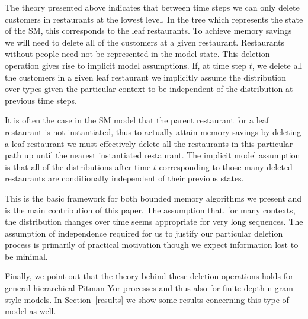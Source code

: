 The theory presented above indicates that between time steps we can only delete customers in restaurants at the lowest level.  In the tree which represents the state of the SM, this corresponds to the leaf restaurants.  To achieve memory savings we will need to delete all of the customers at a given restaurant.  Restaurants without people need not be represented in the model state.  This deletion operation gives rise to implicit model assumptions. If, at time step $t$, we delete all the customers in a given leaf restaurant we implicitly assume the distribution over types given the particular context to be independent of the distribution at previous time steps.

It is often the case in the SM model that the parent restaurant for a leaf restaurant is not instantiated, thus to actually attain memory savings by deleting a leaf restaurant we must effectively delete all the restaurants in this particular path up until the nearest instantiated restaurant.  The implicit model assumption is that all of the distributions after time $t$ corresponding to those many deleted restaurants are conditionally independent of their previous states.

This is the basic framework for both bounded memory algorithms we present and is the main contribution of this paper.  The assumption that, for many contexts, the distribution changes over time seems appropriate for very long sequences. The assumption of independence required for us to justify our particular deletion process is primarily of practical motivation though we expect information lost to be minimal. 

Finally, we point out that the theory behind these deletion operations holds for general hierarchical Pitman-Yor processes and thus also for finite depth n-gram style models.  In Section~\ref{results} we show some results concerning this type of model as well.
